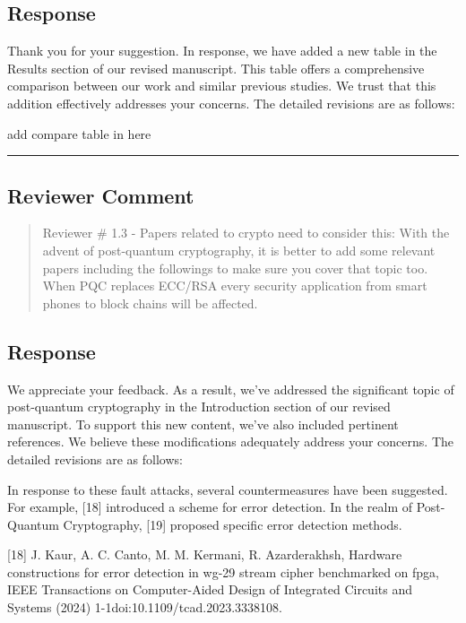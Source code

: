 \subsection{Response}
Thank you for your suggestion. In response, we have added a new table in the Results section of our revised manuscript. This table offers a comprehensive comparison between our work and similar previous studies. We trust that this addition effectively addresses your concerns. The detailed revisions are as follows:

\color{blue}

add compare table in here

\color{black}

\noindent\rule{\linewidth}{2.0pt}

\subsection{Reviewer Comment}
\begin{mdframed}
	\begin{quote}
		Reviewer \# 1.3 - Papers related to crypto need to consider this: With the advent of post-quantum cryptography, it is better to add some relevant papers including the followings to make sure you cover that topic too. When PQC replaces ECC/RSA every security application from smart phones to block chains will be affected.
	\end{quote}
\end{mdframed}

\subsection{Response}

We appreciate your feedback. As a result, we've addressed the significant topic of post-quantum cryptography in the Introduction section of our revised manuscript. To support this new content, we've also included pertinent references. We believe these modifications adequately address your concerns. The detailed revisions are as follows:


\color{blue}

In response to these fault attacks, several countermeasures have been suggested. For example, [18] introduced a scheme for error detection. In the realm of Post-Quantum Cryptography, [19] proposed specific error detection methods.

[18] J. Kaur, A. C. Canto, M. M. Kermani, R. Azarderakhsh, Hardware constructions for error detection in wg-29 stream cipher benchmarked on fpga, IEEE Transactions on Computer-Aided Design of Integrated Circuits and Systems (2024) 1-1doi:10.1109/tcad.2023.3338108.

